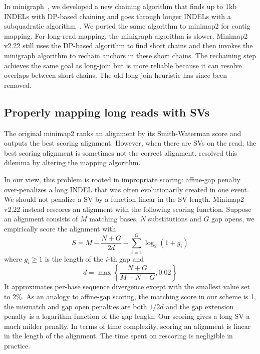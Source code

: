 \documentclass{bioinfo}
\begin{document}
\begin{methods}
In minigraph~\citep{Li:2020aa}, we developed a new chaining algorithm that
finds up to 1kb INDELs with DP-based chaining and goes through longer INDELs with a
subquadratic algorithm~\citep{DBLP:conf/wabi/AbouelhodaO03}. We ported the same
algorithm to minimap2 for contig mapping. For long-read mapping, the minigraph
algorithm is slower. Minimap2 v2.22 still uses the DP-based algorithm to
find short chains and then invokes the minigraph algorithm to rechain anchors in
these short chains. The rechaining step achieves the same goal as long-join
but is more reliable because it can resolve overlaps between short chains. The old
long-join heuristic has since been removed.

\subsection{Properly mapping long reads with SVs}
The original minimap2 ranks an alignment by its Smith-Waterman score and
outputs the best scoring alignment. However, when there are SVs on the read,
the best scoring alignment is sometimes not the correct alignment.
\citet{Jain2020.11.01.363887} resolved this dilemma by altering the mapping
algorithm.

In our view, this problem is rooted in impropriate scoring: affine-gap penalty
over-penalizes a long INDEL that was often evolutionarily created in one event.
We should not penalize a SV by a function linear in the SV length. Minimap2 v2.22 instead rescores
an alignment with the following scoring function. Suppose an alignment consists
of $M$ matching bases, $N$ substitutions and $G$ gap opens, we empirically
score the alignment with
$$
S=M-\frac{N+G}{2d}-\sum_{i=1}^G\log_2(1+g_i)
$$
where $g_i\ge1$ is the length of the $i$-th gap and
$$
d=\max\left\{\frac{N+G}{M+N+G},0.02\right\}
$$
It approximates per-base sequence divergence except with the smallest value set
to 2\%. As an analogy to affine-gap scoring, the matching score in our scheme
is 1, the mismatch and gap open penalties are both $1/2d$ and the gap extension
penalty is a logarithm function of the gap length. Our scoring gives a long SV
a much milder penalty. In terms of time complexity, scoring an alignment is
linear in the length of the alignment. The time spent on rescoring is negligible in
practice.


\end{methods}
\end{document}
